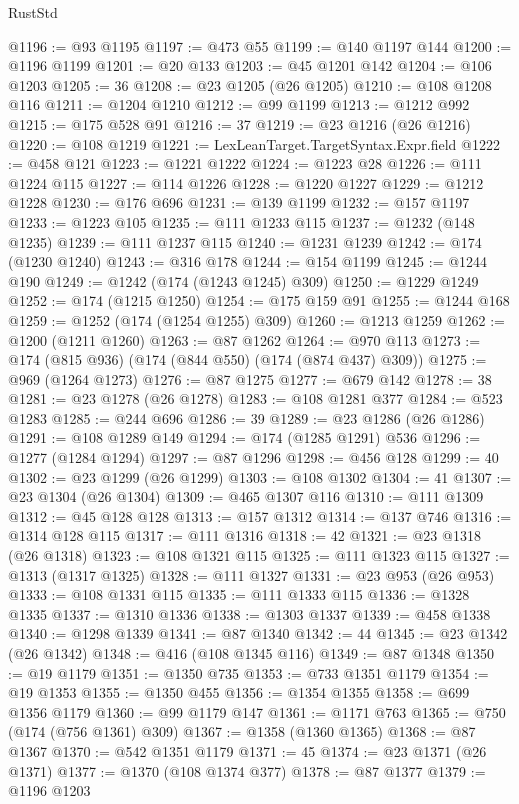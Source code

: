 \begin{lexlean}{RustStd}
\begin{coremodule}
{\begin{coremodule}
{{{{{{{{{{{{{{{{{{{{{{{{{{{{{{{{{{{{{{{{{{{{{{{{{{{{{{{{{{{{{{{{{{{{{{{{{{{{{{@1196 := @93 @1195
@1197 := @473 @55
@1199 := @140 @1197 @144
@1200 := @1196 @1199
@1201 := @20 @133
@1203 := @45 @1201 @142
@1204 := @106 @1203
@1205 := 36
@1208 := @23 @1205 (@26 @1205)
@1210 := @108 @1208 @116
@1211 := @1204 @1210
@1212 := @99 @1199
@1213 := @1212 @992
@1215 := @175 @528 @91
@1216 := 37
@1219 := @23 @1216 (@26 @1216)
@1220 := @108 @1219
@1221 := LexLeanTarget.TargetSyntax.Expr.field
@1222 := @458 @121
@1223 := @1221 @1222
@1224 := @1223 @28
@1226 := @111 @1224 @115
@1227 := @114 @1226
@1228 := @1220 @1227
@1229 := @1212 @1228
@1230 := @176 @696
@1231 := @139 @1199
@1232 := @157 @1197
@1233 := @1223 @105
@1235 := @111 @1233 @115
@1237 := @1232 (@148 @1235)
@1239 := @111 @1237 @115
@1240 := @1231 @1239
@1242 := @174 (@1230 @1240)
@1243 := @316 @178
@1244 := @154 @1199
@1245 := @1244 @190
@1249 := @1242 (@174 (@1243 @1245) @309)
@1250 := @1229 @1249
@1252 := @174 (@1215 @1250)
@1254 := @175 @159 @91
@1255 := @1244 @168
@1259 := @1252 (@174 (@1254 @1255) @309)
@1260 := @1213 @1259
@1262 := @1200 (@1211 @1260)
@1263 := @87 @1262
@1264 := @970 @113
@1273 := @174 (@815 @936) (@174 (@844 @550) (@174 (@874 @437) @309))
@1275 := @969 (@1264 @1273)
@1276 := @87 @1275
@1277 := @679 @142
@1278 := 38
@1281 := @23 @1278 (@26 @1278)
@1283 := @108 @1281 @377
@1284 := @523 @1283
@1285 := @244 @696
@1286 := 39
@1289 := @23 @1286 (@26 @1286)
@1291 := @108 @1289 @149
@1294 := @174 (@1285 @1291) @536
@1296 := @1277 (@1284 @1294)
@1297 := @87 @1296
@1298 := @456 @128
@1299 := 40
@1302 := @23 @1299 (@26 @1299)
@1303 := @108 @1302
@1304 := 41
@1307 := @23 @1304 (@26 @1304)
@1309 := @465 @1307 @116
@1310 := @111 @1309
@1312 := @45 @128 @128
@1313 := @157 @1312
@1314 := @137 @746
@1316 := @1314 @128 @115
@1317 := @111 @1316
@1318 := 42
@1321 := @23 @1318 (@26 @1318)
@1323 := @108 @1321 @115
@1325 := @111 @1323 @115
@1327 := @1313 (@1317 @1325)
@1328 := @111 @1327
@1331 := @23 @953 (@26 @953)
@1333 := @108 @1331 @115
@1335 := @111 @1333 @115
@1336 := @1328 @1335
@1337 := @1310 @1336
@1338 := @1303 @1337
@1339 := @458 @1338
@1340 := @1298 @1339
@1341 := @87 @1340
@1342 := 44
@1345 := @23 @1342 (@26 @1342)
@1348 := @416 (@108 @1345 @116)
@1349 := @87 @1348
@1350 := @19 @1179
@1351 := @1350 @735
@1353 := @733 @1351 @1179
@1354 := @19 @1353
@1355 := @1350 @455
@1356 := @1354 @1355
@1358 := @699 @1356 @1179
@1360 := @99 @1179 @147
@1361 := @1171 @763
@1365 := @750 (@174 (@756 @1361) @309)
@1367 := @1358 (@1360 @1365)
@1368 := @87 @1367
@1370 := @542 @1351 @1179
@1371 := 45
@1374 := @23 @1371 (@26 @1371)
@1377 := @1370 (@108 @1374 @377)
@1378 := @87 @1377
@1379 := @1196 @1203
}}}}}}}}}}}}}}}}}}}}}}}}}}}}}}}}}}}}}}}}}}}}}}}}}}}}}}}}}}}}}}}}}}}}}}}}}}}}}}
\end{coremodule}}
\end{coremodule}
\end{lexlean}
